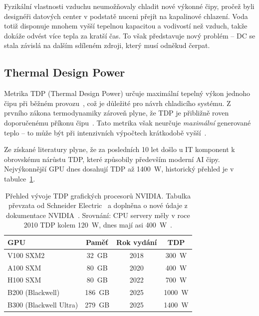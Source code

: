 Fyzikální vlastnosti vzduchu neumožňovaly chladit nové výkonné čipy, pročež byli designéři datových center v podstatě nuceni přejít na kapalinové chlazení. Voda totiž disponuje mnohem vyšší tepelnou kapacitou a vodivostí než vzduch, takže dokáže odvést více tepla za kratší čas. To však představuje nový problém -- DC se stala závislá na dalším sdíleném zdroji, který musí odněkud čerpat.

\subsection{Thermal Design Power}
\label{sec:tdp}

Metrika TDP (Thermal Design Power) určuje maximální tepelný výkon jednoho čipu při běžném provozu~\cite{mahajan_cooling_2006}, což je důležité pro návrh chladicího systému. Z prvního zákona termodynamiky zároveň plyne, že TDP je přibližně roven doporučenému příkonu čipu~\cite{avelar_ai_2023}. Tato metrika však neurčuje \textit{maximální} generované teplo -- to může být při intenzivních výpočtech krátkodobě vyšší~\cite{gigabyte_tdp_2026}.

Ze získané literatury plyne, že za posledních 10 let došlo u IT komponent k obrovskému nárůstu TDP, které způsobily především moderní AI čipy. Nejvýkonnější GPU dnes dosahují TDP až 1400~W, historický přehled je v tabulce~\ref{tab:gpu_tdp}. 

\begin{table}[] \centering

    \begin{tabular}{lccc}
        \toprule
        \textbf{GPU} & \textbf{Paměť} & \textbf{Rok vydání} & \textbf{TDP} \\
        \midrule
         V100 SXM2 & 32~GB & 2018 & 300~W \\
         A100 SXM & 80~GB & 2020 & 400~W \\
         H100 SXM & 80~GB & 2022 & 700~W \\
         B200 (Blackwell) & 186~GB & 2025 & 1000~W \\
         B300 (Blackwell Ultra) & 279~GB & 2025 & 1400~W \\
        \bottomrule
    \end{tabular}

    \caption[Přehled vývoje TDP]{Přehled vývoje TDP grafických procesorů NVIDIA. Tabulka převzata od Schneider Electric~\cite{avelar_ai_2023} a doplněna o nové údaje z dokumentace NVIDIA~\cite{nvidia_nvidia_2025, nvidia_nvidia_2025-1}. Srovnání: CPU servery měly v roce 2010 TDP kolem 120~W, dnes mají asi 400~W~\cite{bizo_silicon_2022}.}
    \label{tab:gpu_tdp}

\end{table}

